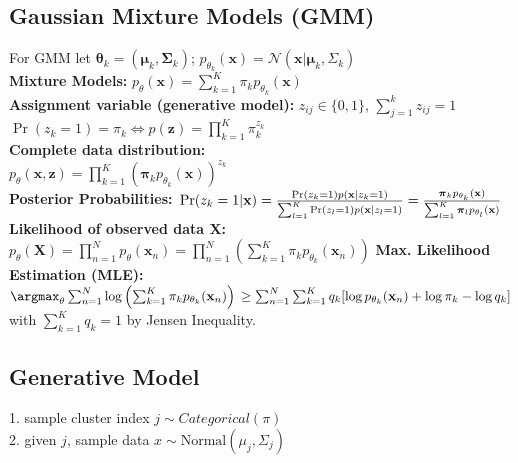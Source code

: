 \documentclass[9pt,parskip]{scrartcl}
\begin{document}
\begin{multicols*}{4}
\subsection*{Gaussian Mixture Models (GMM)}
For GMM let $\boldsymbol{\theta}_k = (\boldsymbol{\mu}_k, \boldsymbol{\Sigma}_k)$; $p_{\theta_k}(\mathbf{x}) = \mathcal{N}(\mathbf{x} | \boldsymbol{\mu}_k, \Sigma_k)$\\
\textbf{Mixture Models:} $p_\theta(\mathbf{x}) = \sum_{k=1}^K \pi_k p_{\theta_k}(\mathbf{x})$\\
\textbf{Assignment variable (generative model):} $z_{ij} \in \{0, 1\}$, $\sum_{j=1}^k z_{ij} = 1$\\
$\operatorname{Pr}(z_k = 1) = \pi_k \Leftrightarrow p(\mathbf{z}) = \prod_{k=1}^K \pi_k^{z_k}$\\
\textbf{Complete data distribution:}\\
$p_\theta(\mathbf{x}, \mathbf{z}) = \prod_{k=1}^K \left( \boldsymbol{\pi}_k p_{\theta_k}(\mathbf{x})\right)^{z_k}$\\
\textbf{Posterior Probabilities:} $\\\operatorname{Pr}(z_k = 1 | \mathbf{x}) = \frac{\operatorname{Pr}(z_k = 1) p(\mathbf{x} | z_k = 1)}{\sum_{l=1}^K \operatorname{Pr}(z_l = 1) p(\mathbf{x} | z_l = 1)} = \frac{\boldsymbol{\pi}_k p_{\theta_k}(\mathbf{x})}{\sum_{l=1}^K \boldsymbol{\pi}_l p_{\theta_l}(\mathbf{x})}$
\textbf{Likelihood of observed data $\mathbf{X}$:}\\
$p_\theta(\mathbf{X}) = \prod_{n=1}^N p_\theta(\mathbf{x}_n) = \prod_{n=1}^N \left(\sum_{k=1}^K \pi_k p_{\theta_k}(\mathbf{x}_n)\right)$
\textbf{Max. Likelihood Estimation (MLE):}\\
$\argmax_\theta\sum_{n=1}^N \log \left( \sum_{k=1}^K \pi_k p_{\theta_k}(\mathbf{x}_n)\right)\\
\ge \sum_{n=1}^N \sum_{k=1}^K{q_k[\log p_{\theta_k}(\mathbf{x}_n) + \log \pi_k - \log q_k]}$\\
with $\sum_{k=1}^K{q_k} = 1$ by Jensen Inequality.

\subsection*{Generative Model}
1. sample cluster index $j \sim Categorical(\pi)$\\
2. given $j$, sample data $x \sim \text{Normal}(\mu_j, \Sigma_j)$



\end{multicols*}
\end{document}
